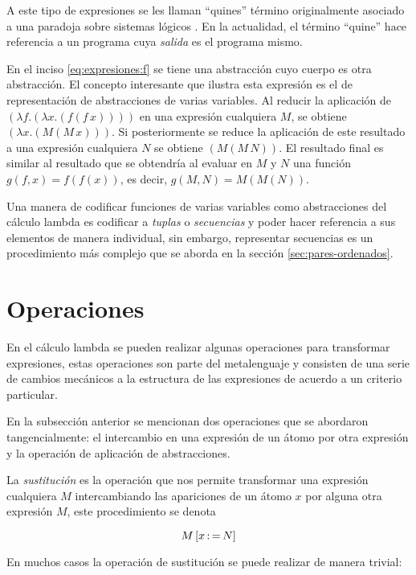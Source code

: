 A este tipo de expresiones se les llaman ``quines'' \cite[pp.~431--437]{Hofstadter:GEB} término originalmente asociado a una paradoja sobre sistemas lógicos \cite{Quine:Paradox}. En la actualidad, el término ``quine'' hace referencia a un programa cuya \emph{salida} es el programa mismo.

En el inciso \eqref{eq:expresiones:f} se tiene una abstracción cuyo cuerpo es otra abstracción. El concepto interesante que ilustra esta expresión es el de representación de abstracciones de varias variables. Al reducir la aplicación de \( (λf.(λx.(f(f\, x)))) \) en una expresión cualquiera \( M \), se obtiene \( (λx.(M(M\, x))) \). Si posteriormente se reduce la aplicación de este resultado a una expresión cualquiera \( N \) se obtiene \( (M(M\, N)) \). El resultado final es similar al resultado que se obtendría al evaluar en \( M \) y \( N \) una función \( g(f,x) = f(f(x)) \), es decir, \( g(M,N) = M(M(N)) \).

Una manera de codificar funciones de varias variables como abstracciones del cálculo lambda es codificar a \emph{tuplas} o \emph{secuencias} y poder hacer referencia a sus elementos de manera individual, sin embargo, representar secuencias es un procedimiento más complejo que se aborda en la sección \ref{sec:pares-ordenados}.

\section{Operaciones}
\label{sec:operaciones}

En el cálculo lambda se pueden realizar algunas operaciones para transformar expresiones, estas operaciones son parte del metalenguaje y consisten de una serie de cambios mecánicos a la estructura de las expresiones de acuerdo a un criterio particular.

En la subsección anterior se mencionan dos operaciones que se abordaron tangencialmente: el intercambio en una expresión de un átomo por otra expresión y la operación de aplicación de abstracciones.

La \emph{sustitución} es la operación que nos permite transformar una expresión cualquiera \( M \) intercambiando las apariciones de un átomo \( x \) por alguna otra expresión \( M \), este procedimiento se denota

\[ M \left[ x \operatorname{:=} N \right] \]

En muchos casos la operación de sustitución se puede realizar de manera trivial: \\

